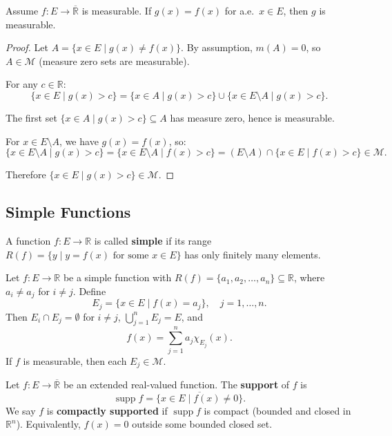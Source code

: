 \documentclass[11pt]{report}
\begin{document}
\begin{propbox}
Assume $f: E \to \overline{\mathbb{R}}$ is measurable. If $g(x) = f(x)$ for a.e.\ $x \in E$, then $g$ is measurable.
\end{propbox}

\begin{proof}
Let $A = \{x \in E \mid g(x) \neq f(x)\}$. By assumption, $m(A) = 0$, so $A \in \mathcal{M}$ (measure zero sets are measurable).

For any $c \in \mathbb{R}$:
\[
\{x \in E \mid g(x) > c\} = \{x \in A \mid g(x) > c\} \cup \{x \in E \setminus A \mid g(x) > c\}.
\]

The first set $\{x \in A \mid g(x) > c\} \subseteq A$ has measure zero, hence is measurable.

For $x \in E \setminus A$, we have $g(x) = f(x)$, so:
\[
\{x \in E \setminus A \mid g(x) > c\} = \{x \in E \setminus A \mid f(x) > c\} = (E \setminus A) \cap \{x \in E \mid f(x) > c\} \in \mathcal{M}.
\]

Therefore $\{x \in E \mid g(x) > c\} \in \mathcal{M}$.
\end{proof}

\subsection{Simple Functions}

\begin{defbox}
A function $f: E \to \mathbb{R}$ is called \textbf{simple} if its range $R(f) = \{y \mid y = f(x) \text{ for some } x \in E\}$ has only finitely many elements.
\end{defbox}

\begin{propbox}
Let $f: E \to \mathbb{R}$ be a simple function with $R(f) = \{a_1, a_2, \ldots, a_n\} \subseteq \mathbb{R}$, where $a_i \neq a_j$ for $i \neq j$. Define
\[
E_j = \{x \in E \mid f(x) = a_j\}, \quad j = 1, \ldots, n.
\]
Then $E_i \cap E_j = \emptyset$ for $i \neq j$, $\bigcup_{j=1}^n E_j = E$, and
\[
f(x) = \sum_{j=1}^{n} a_j \chi_{E_j}(x).
\]
If $f$ is measurable, then each $E_j \in \mathcal{M}$.
\end{propbox}

\begin{defbox}
Let $f: E \to \overline{\mathbb{R}}$ be an extended real-valued function. The \textbf{support} of $f$ is
\[
\operatorname{supp} f = \overline{\{x \in E \mid f(x) \neq 0\}}.
\]
We say $f$ is \textbf{compactly supported} if $\operatorname{supp} f$ is compact (bounded and closed in $\mathbb{R}^n$). Equivalently, $f(x) = 0$ outside some bounded closed set.
\end{defbox}
\end{document}
